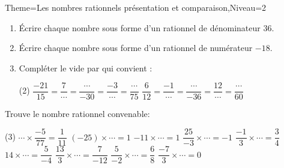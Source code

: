 \documentclass[a4paper,12pt]{article}
\begin{document}
\begin{Maquette}[Fiche]{Theme=Les nombres rationnels présentation et comparaison,Niveau=2}

\begin{exercice}
\begin{enumerate}
\item \'Ecrire chaque nombre sous forme d'un rationnel de dénominateur $36$.\newline
{}
\item  \'Ecrire chaque nombre sous forme d'un rationnel de numérateur $-18$.\newline
{}
\item Compléter le vide  par qui convient :
\begin{tasks}(2)
\task $\dfrac{-21}{15}=\dfrac{7}{\cdots}=\dfrac{\cdots}{-30}=\dfrac{-3}{\cdots}=\dfrac{\cdots}{75} $
\task $\dfrac{6}{12}=\dfrac{-1}{\cdots}=\dfrac{\cdots}{-36}=\dfrac{12}{\cdots}=\dfrac{\cdots}{60} $
\end{tasks}
\end{enumerate}
\end{exercice}

\begin{exercice}
Trouve le nombre rationnel convenable:
\begin{tasks}(3)
\task $\cdots\times \dfrac{-5}{77}=\dfrac{1}{11}$
\task $ (-25)\times\cdots =1$
\task $ -11\times \cdots =1 $
\task $\dfrac{25}{-3}\times\cdots =-1 $
\task $\dfrac{-1}{3}\times \cdots =\dfrac{3}{4}$
\task $ 14\times \cdots =\dfrac{5}{-4}$
\task $ \dfrac{13}{3}\times \cdots  = \dfrac{7}{-12} $
\task $\dfrac{5}{-2}\times \cdots =\dfrac{6}{8}$
\task $ \dfrac{-7}{3}\times \cdots =0 $
\end{tasks}
\end{exercice}


\end{Maquette}
\end{document}
